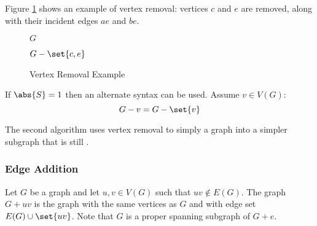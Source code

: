 Figure \ref{fig:vremove} shows an example of vertex removal: vertices \(c\) and \(e\) are removed, along with their
incident edges \(ae\) and \(be\).

\begin{figure}[h]
  \label{fig:vremove}
  \begin{minipage}{3in}
    \begin{center}

      \bigskip

      \(G\)
    \end{center}
  \end{minipage}
  \begin{minipage}{3in}
    \begin{center}

      \bigskip

      \(G-\set{c,e}\)
    \end{center}
  \end{minipage}
  \caption{Vertex Removal Example}
\end{figure}

If \(\abs{S}=1\) then an alternate syntax can be used.  Assume \(v\in V(G)\):
\[G-v=G-\set{v}\]

The second algorithm uses vertex removal to simply a  graph into a simpler subgraph that is still
.

\subsubsection{Edge Addition}

Let \(G\) be a graph and let \(u,v\in V(G)\) such that \(uv\notin E(G)\).  The graph \(G+uv\) is the graph with the
same vertices as \(G\) and with edge set \(E(G)\cup\set{uv}\).  Note that \(G\) is a proper spanning subgraph of
\(G+e\).

